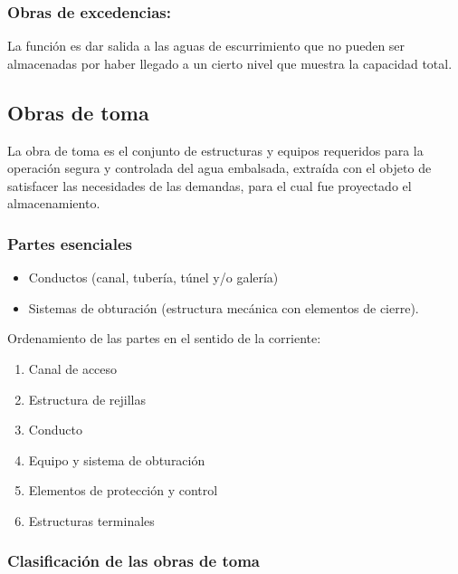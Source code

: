 \subsubsection{Obras de excedencias:} La función es dar salida a las aguas de escurrimiento que
no pueden ser almacenadas por haber llegado a un cierto nivel que muestra la
capacidad total.



\subsection{Obras de toma}

\begin{definition}
	La obra de toma es el conjunto de estructuras y equipos requeridos para la
	operación segura y controlada del agua embalsada, extraída con el objeto de satisfacer
	las necesidades de las demandas, para el cual fue proyectado el almacenamiento.
\end{definition}

\subsubsection{Partes esenciales}

\begin{itemize}
	\item Conductos (canal, tubería, túnel y/o galería)
	\item Sistemas de obturación (estructura mecánica con elementos de cierre).
\end{itemize}

Ordenamiento de las partes en el sentido de la corriente:

\begin{enumerate}
	\item Canal de acceso
	\item Estructura de rejillas
	\item Conducto
	\item Equipo y sistema de obturación
	\item Elementos de protección y control
	\item Estructuras terminales
\end{enumerate}

\subsubsection{Clasificación de las obras de toma}

